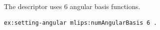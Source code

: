 The descriptor uses 6 angular basis functions.
\begin{lstlisting}[language=turtle]
ex:setting-angular mlips:numAngularBasis 6 .
\end{lstlisting}

